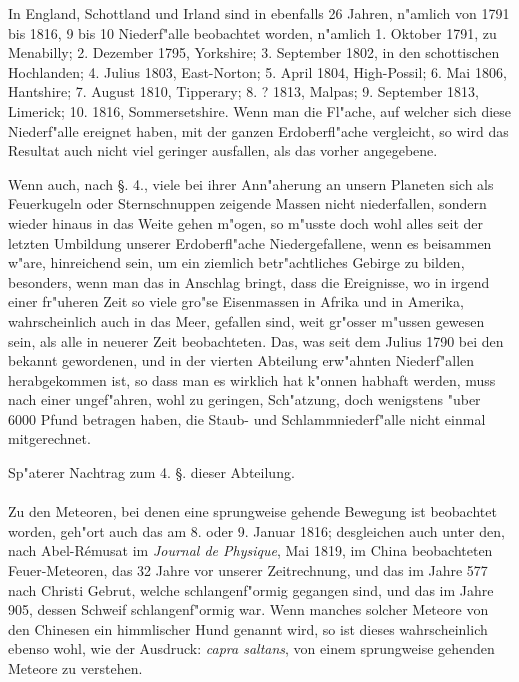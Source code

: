 \documentclass[a4paper, 11pt, oneside, polutonikogreek, german]{article}
\begin{document}
In England, Schottland und Irland sind in ebenfalls 26 Jahren, n"amlich von 1791 bis 1816, 9 bis 10 Niederf"alle beobachtet worden, n"amlich 1. Oktober 1791, zu Menabilly; 2. Dezember 1795, Yorkshire; 3. September 1802, in den schottischen Hochlanden; 4. Julius 1803, East-Norton; 5. April 1804, High-Possil; 6. Mai 1806, Hantshire; 7. August 1810, Tipperary; 8. ? 1813, Malpas; 9. September 1813, Limerick; 10. 1816, Sommersetshire. Wenn man die Fl"ache, auf welcher sich diese Niederf"alle ereignet haben, mit der ganzen Erdoberfl"ache vergleicht, so wird das Resultat auch nicht viel geringer ausfallen, als das vorher angegebene.

Wenn auch, nach §. 4., viele bei ihrer Ann"aherung an unsern Planeten sich als Feuerkugeln oder Sternschnuppen zeigende Massen nicht niederfallen, sondern wieder hinaus in das Weite gehen m"ogen, so m"usste doch wohl alles seit der letzten Umbildung unserer Erdoberfl"ache Niedergefallene, wenn es beisammen w"are, hinreichend sein, um ein ziemlich betr"achtliches Gebirge zu bilden, besonders, wenn man das in Anschlag bringt, dass die Ereignisse, wo in irgend einer fr"uheren Zeit so viele gro"se Eisenmassen in Afrika und in Amerika, wahrscheinlich auch in das Meer, gefallen sind, weit gr"osser m"ussen gewesen sein, als alle in neuerer Zeit beobachteten. Das, was seit dem Julius 1790 bei den bekannt gewordenen, und in der vierten Abteilung erw"ahnten Niederf"allen herabgekommen ist, so dass man es wirklich hat k"onnen habhaft werden, muss nach einer ungef"ahren, wohl zu geringen, Sch"atzung, doch wenigstens "uber 6000 Pfund betragen haben, die Staub- und Schlammniederf"alle nicht einmal mitgerechnet.
\begin{center}
Sp"aterer Nachtrag zum 4. §. dieser Abteilung.
\end{center}
\paragraph{}
Zu den Meteoren, bei denen eine sprungweise gehende Bewegung ist beobachtet worden, geh"ort auch das am 8. oder 9. Januar 1816; desgleichen auch unter den, nach Abel-Rémusat im \emph{Journal de Physique}, Mai 1819, im China beobachteten Feuer-Meteoren, das 32 Jahre vor unserer Zeitrechnung, und das im Jahre 577 nach Christi Gebrut, welche schlangenf"ormig gegangen sind, und das im Jahre 905, dessen Schweif schlangenf"ormig war. Wenn manches solcher Meteore von den Chinesen ein himmlischer Hund genannt wird, so ist dieses wahrscheinlich ebenso wohl, wie der Ausdruck: \emph{capra saltans}, von einem sprungweise gehenden Meteore zu verstehen.
\clearpage
\end{document}

